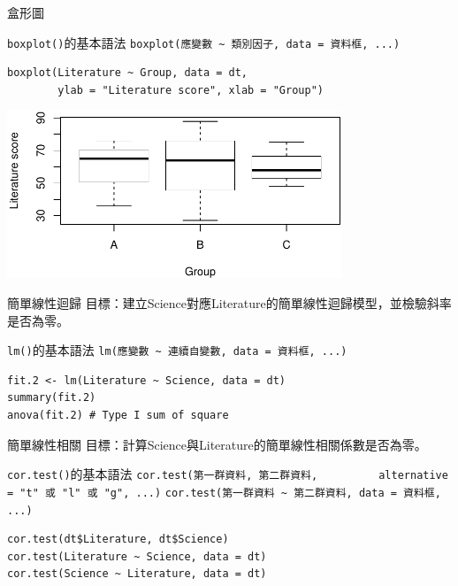 \documentclass[12pt, aspectratio=43]{beamer}
\begin{document}
\begin{frame}[fragile]{盒形圖}

\begin{block}{\texttt{boxplot()}的基本語法}
\verb+boxplot(應變數 ~ 類別因子, data = 資料框, ...)+
\end{block}

\begin{verbatim}
boxplot(Literature ~ Group, data = dt, 
        ylab = "Literature score", xlab = "Group")
\end{verbatim}

\begin{center}
\includegraphics[width=0.75\textwidth]{Rplot-three-group.pdf}
\end{center}
\end{frame}

%


\begin{frame}[fragile]{簡單線性迴歸}
目標：建立Science對應Literature的簡單線性迴歸模型，並檢驗斜率是否為零。
\begin{block}{\texttt{lm()}的基本語法}
\verb+lm(應變數 ~ 連續自變數, data = 資料框, ...)+
\end{block}
\begin{verbatim}
fit.2 <- lm(Literature ~ Science, data = dt)
summary(fit.2)
anova(fit.2) # Type I sum of square
\end{verbatim}
\end{frame}


\begin{frame}[fragile]{簡單線性相關}
目標：計算Science與Literature的簡單線性相關係數是否為零。
\begin{block}{\texttt{cor.test()}的基本語法}
\verb+cor.test(第一群資料, 第二群資料,+
\verb+         alternative = "t" 或 "l" 或 "g", ...)+
\verb+cor.test(第一群資料 ~ 第二群資料, data = 資料框, ...)+
\end{block}
\begin{verbatim}
cor.test(dt$Literature, dt$Science)
cor.test(Literature ~ Science, data = dt)
cor.test(Science ~ Literature, data = dt)
\end{verbatim}
\end{frame}
\end{document}
